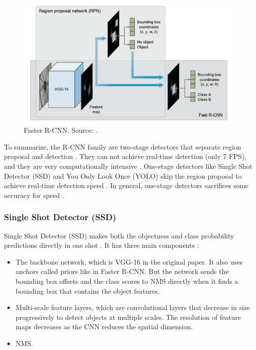 \documentclass[a4paper, 11pt, oneside]{article}
\begin{document}
\begin{figure}[ht]
  \begin{center}
    \includegraphics[width=.8\textwidth]{faster_r_cnn.png}
  \end{center}
  \caption{Faster R-CNN. Source: \cite{elgendy2020deep}.}
\end{figure}

To summarize, the R-CNN family are two-stage detectors that separate region proposal and detection
\cite{elgendy2020deep, liu2020deep}. They can not achieve real-time detection (only 7 FPS), and they are very
computationally intensive \cite{elgendy2020deep, liu2016ssd, redmon2016you}.
One-stage detectors like Single Shot Detector (SSD) and You Only Look Once (YOLO) skip the region proposal to achieve
real-time detection speed \cite{elgendy2020deep}. In general, one-stage detectors sacrifices some accuracy for speed
\cite{elgendy2020deep, lin2017focal}.

\subsubsection{Single Shot Detector (SSD)}

Single Shot Detector (SSD) makes both the objectness and class probability predictions directly in one shot
\cite{elgendy2020deep, liu2016ssd}. It has three main components \cite{elgendy2020deep, liu2016ssd}:

\begin{itemize}
  \item The backbone network, which is VGG-16 in the original paper. It also uses anchors called priors like in Faster R-CNN.
  But the network sends the bounding box offsets and the class scores to NMS directly when it finds a bounding box that
  contains the object features.
  \item Multi-scale feature layers, which are convolutional layers that decrease in size progressively to detect objects
  at multiple scales. The resolution of feature maps decreases as the CNN reduces the spatial dimension.
  \item NMS.
\end{itemize}
\end{document}
